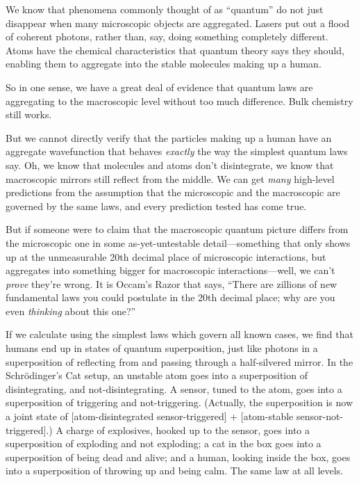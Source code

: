 {
 We know that phenomena commonly thought of as
``quantum'' do not just disappear
when many microscopic objects are aggregated. Lasers put out a flood of
coherent photons, rather than, say, doing something completely
different. Atoms have the chemical characteristics that quantum theory
says they should, enabling them to aggregate into the stable molecules
making up a human.}

{
 So in one sense, we have a great deal of evidence that quantum
laws are aggregating to the macroscopic level without too much
difference. Bulk chemistry still works.}

{
 But we cannot directly verify that the particles making up a human
have an aggregate wavefunction that behaves \textit{exactly} the way
the simplest quantum laws say. Oh, we know that molecules and atoms
don't disintegrate, we know that macroscopic mirrors
still reflect from the middle. We can get \textit{many} high-level
predictions from the assumption that the microscopic and the
macroscopic are governed by the same laws, and every prediction tested
has come true.}

{
 But if someone were to claim that the macroscopic quantum picture
differs from the microscopic one in some as-yet-untestable
detail---something that only shows up at the unmeasurable 20th decimal
place of microscopic interactions, but aggregates into something bigger
for macroscopic interactions---well, we can't
\textit{prove} they're wrong. It is
Occam's Razor that says, ``There are
zillions of new fundamental laws you could postulate in the 20th
decimal place; why are you even \textit{thinking} about this
one?''}

{
 If we calculate using the simplest laws which govern all known
cases, we find that humans end up in states of quantum superposition,
just like photons in a superposition of reflecting from and passing
through a half-silvered mirror. In the Schrödinger's
Cat setup, an unstable atom goes into a superposition of
disintegrating, and not-disintegrating. A sensor, tuned to the atom,
goes into a superposition of triggering and not-triggering. (Actually,
the superposition is now a joint state of [atom-disintegrated
{\texttimes} sensor-triggered] + [atom-stable {\texttimes}
sensor-not-triggered].) A charge of explosives, hooked up to the
sensor, goes into a superposition of exploding and not exploding; a cat
in the box goes into a superposition of being dead and alive; and a
human, looking inside the box, goes into a superposition of throwing up
and being calm. The same law at all levels.}

